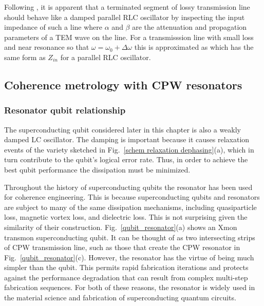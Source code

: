 Following  \cite{Pozar}, it is apparent that a terminated segment of lossy transmission line should behave like a damped parallel RLC oscillator by inspecting the input impedance of such a line
where $\alpha$ and $\beta$ are the attenuation and propagation parameters of a TEM wave on the line.
For a transmisssion line with small loss and near resonance so that $\omega = \omega_0 + \Delta \omega$ this is approximated as
which has the same form as $Z_{in}$ for a parallel RLC oscillator.

\subsection{Coherence metrology with CPW resonators}

\subsubsection{Resonator qubit relationship}

The superconducting qubit considered later in this chapter is also a weakly damped LC oscillator.
The damping is important because it causes relaxation events of the variety sketched in Fig.~\ref{schem relaxation dephasing}(a),
which in turn contribute to the qubit's logical error rate.
Thus, in order to achieve the best qubit performance the dissipation must be minimized.

Throughout the history of superconducting qubits the resonator has been used for coherence engineering.
This is because superconducting qubits and resonators are subject to many of the same dissipation mechanisms,
including quasiparticle loss, magnetic vortex loss, and dielectric loss.
This is not surprising given the similarity of their construction.
Fig.~\ref{qubit_resonator}(a) shows an Xmon transmon superconducting qubit.
It can be thought of as two intersecting strips of CPW transmission line,
such as those that create the CPW resonator in Fig.~\ref{qubit_resonator}(c).
However, the resonator has the virtue of being much simpler than the qubit.
This permits rapid fabrication iterations and protects against the performance degradation that can result from complex multi-step fabrication sequences.
For both of these reasons, the resonator is widely used in the material science and fabrication of superconducting quantum circuits.

